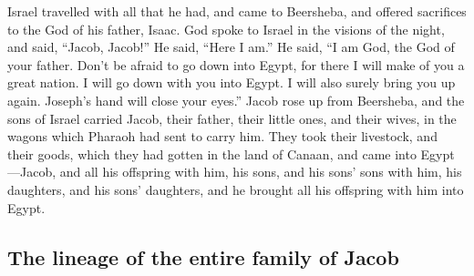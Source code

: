  Israel travelled with all that he had, and came to
Beersheba, and offered sacrifices to the God of his father, Isaac.
 God spoke to Israel in the visions of the night, and
said, ``Jacob, Jacob!'' He said, ``Here I am.''  He said,
``I am God, the God of your father. Don't be afraid to go down into
Egypt, for there I will make of you a great nation.  I
will go down with you into Egypt. I will also surely bring you up again.
Joseph's hand will close your eyes.''  Jacob rose up from
Beersheba, and the sons of Israel carried Jacob, their father, their
little ones, and their wives, in the wagons which Pharaoh had sent to
carry him.  They took their livestock, and their goods,
which they had gotten in the land of Canaan, and came into
Egypt---Jacob, and all his offspring with him,  his sons,
and his sons' sons with him, his daughters, and his sons' daughters, and
he brought all his offspring with him into Egypt.

\hypertarget{the-lineage-of-the-entire-family-of-jacob}{%
\subsection{The lineage of the entire family of
Jacob}\label{the-lineage-of-the-entire-family-of-jacob}}


